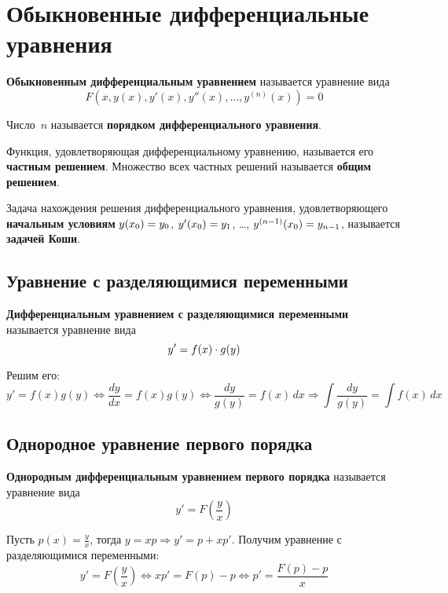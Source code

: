 \section{Обыкновенные дифференциальные уравнения}
 \textbf{Обыкновенным дифференциальным уравнением} называется уравнение вида
\begin{equation*}
F(x, y(x), y'(x), y''(x), \ldots, y^{(n)}(x)) = 0
\end{equation*}

Число~$n$ называется \textbf{порядком дифференциального уравнения}.

Функция, удовлетворяющая дифференциальному уравнению, называется его \textbf{частным решением}.
Множество всех частных решений называется \textbf{общим решением}.

Задача нахождения решения дифференциального уравнения, удовлетворяющего \textbf{начальным условиям} $y(x_0) \opbr= y_0$, $y'(x_0) \opbr= y_1$, \ldots, $y^{(n-1)}(x_0) \opbr= y_{n-1}$, называется \textbf{задачей Коши}.

\subsection{Уравнение с разделяющимися переменными}
 \textbf{Дифференциальным уравнением с разделяющимися переменными} называется уравнение вида
\begin{equation*}
y' \opbr= f(x) \cdot g(y)
\end{equation*}

Решим его:
\begin{equation*}
y' = f(x)g(y) \Leftrightarrow
\frac{dy}{dx} = f(x)g(y) \Leftrightarrow
\frac{dy}{g(y)} = f(x)\,dx \Rightarrow
\int \frac{dy}{g(y)} = \int f(x)\,dx
\end{equation*}

\subsection{Однородное уравнение первого порядка}
 \textbf{Однородным дифференциальным уравнением первого порядка} называется уравнение вида
\begin{equation*}
y' = F \left( \frac{y}x \right)
\end{equation*}

Пусть $p(x) = \frac{y}x$, тогда $y = xp \Rightarrow y' = p + xp'$.
Получим уравнение с разделяющимися переменными:
\begin{equation*}
y' = F \left( \frac{y}x \right) \Leftrightarrow
x p' = F(p) - p \Leftrightarrow
p' = \frac{F(p) - p}x
\end{equation*}

